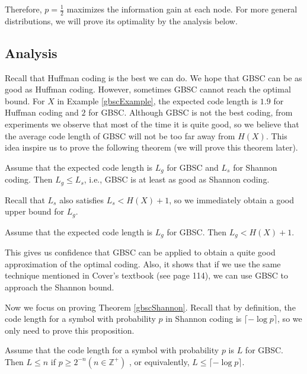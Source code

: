 Therefore, $p=\frac{1}{2}$ maximizes the information gain at each node. For more general distributions, we will prove its optimality by the analysis below.

\subsection{Analysis}

Recall that Huffman coding is the best we can do. We hope that GBSC can be as good as Huffman coding. However, sometimes GBSC cannot reach the optimal bound. For $X$ in Example \ref{gbscExample}, the expected code length is $1.9$ for Huffman coding and $2$ for GBSC. Although GBSC is not the best coding, from experiments we observe that most of the time it is quite good, so we believe that the average code length of GBSC will not be too far away from $H(X)$. This idea inspire us to prove the following theorem (we will prove this theorem later).

\begin{theorem}
\label{gbscShannon}
Assume that the expected code length is $L_g$ for GBSC and $L_s$ for Shannon coding. Then $L_g \le L_s$, i.e., GBSC is at least as good as Shannon coding.
\end{theorem}

Recall that $L_s$ also satisfies $L_s < H(X)+1$, so we immediately obtain a good upper bound for $L_g$.

\begin{corollary}
Assume that the expected code length is $L_g$ for GBSC. Then $L_g < H(X) + 1$.
\end{corollary}

This gives us confidence that GBSC can be applied to obtain a quite good approximation of the optimal coding. Also, it shows that if we use the same technique mentioned in Cover's textbook (see page 114), we can use GBSC to approach the Shannon bound.

Now we focus on proving Theorem \ref{gbscShannon}. Recall that by definition, the code length for a symbol with probability $p$ in Shannon coding is $\lceil -\log p \rceil$, so we only need to prove this proposition.

\begin{proposition}
\label{prop1}
Assume that the code length for a symbol with probability $p$ is $L$ for GBSC. Then $L \le n$ if $p \ge 2^{-n}(n \in \mathbb{Z^+})$ , or equivalently, $L \le \lceil -\log p \rceil$.
\end{proposition}


